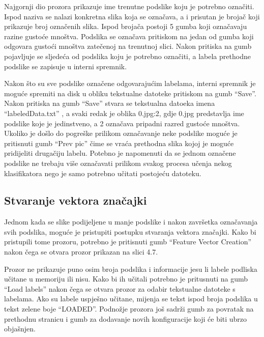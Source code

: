 \documentclass[times, utf8, zavrsni]{fer}
\begin{document}
Najgornji dio prozora prikazuje ime trenutne podslike koju je potrebno označiti.
Ispod naziva se nalazi konkretna slika koja se označava, a i prisutan je brojač
koji prikazuje broj označenih slika. Ispod brojača postoji 5 gumba koji
označavaju razine gustoće mnoštva. Podslika se označava pritiskom na jedan
od gumba koji odgovara gustoći mnoštva zatečenoj na trenutnoj slici. Nakon pritiska
na gumb pojavljuje se sljedeća od podslika koju je potrebno označiti, a labela
prethodne podslike se zapisuje u interni spremnik. 

\bigbreak

Nakon što su sve podslike označene
odgovarajućim labelama, interni spremnik je moguće spremiti na disk u obliku 
tekstualne datoteke pritiskom na gumb \enquote{Save}. Nakon pritiska na gumb
\enquote{Save} stvara se tekstualna datoeka imena \enquote{labeledData.txt}
, a svaki redak je oblika 0.jpg:2, gdje 0.jpg predstavlja ime podslike koje 
je jedinstveno, a 2 označava pripadni razred gustoće mnoštva. Ukoliko je 
došlo do pogreške prilikom označavanje neke podslike moguće je pritisnuti
gumb \enquote{Prev pic} čime se vraća prethodna slika kojoj je moguće pridijeliti
drugačiju labelu. Potebno je napomenuti da se jednom označene podslike ne trebaju 
više označavati prilikom svakog procesa učenja nekog klasifikatora nego 
je samo potrebno učitati postojeću datoteku.

\subsection{Stvaranje vektora značajki}

Jednom kada se slike podijeljene u manje podslike i nakon završetka označavanja
svih podslika, moguće je pristupiti postupku stvaranja vektora značajki. 
Kako bi pristupili tome prozoru, potrebno je pritisnuti gumb \enquote{Feature Vector Creation} 
nakon čega se otvara prozor prikazan na slici 4.7.

Prozor ne prikazuje puno osim broja podslika i informacije jesu li labele
podliska učitane u memoriju ili nisu. Kako bi ih učitali potrebno je pritusnuti
na gumb \enquote{Load labels} nakon čega se otvara prozor za odabir tekstualne datoteke
s labelama. Ako su labele uspješno učitane, mijenja se tekst ispod broja
podslika u tekst zelene boje \enquote{LOADED}. Podnožje prozora još sadrži gumb
za povratak na prethodnu stranicu i gumb za dodavanje novih konfiguracije koji će biti
ubrzo objašnjen. 

\bigbreak
\end{document}
